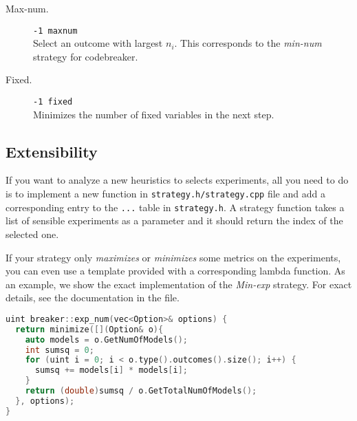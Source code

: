 \begin{description}
\item[Max-num.] \texttt{-1 maxnum} \\
  Select an outcome with largest $n_i$. This
  corresponds to the \emph{min-num} strategy for codebreaker.
\item[Fixed.] \texttt{-1 fixed} \\
  Minimizes the number of fixed variables in the next step.
\end{description}

\subsection{Extensibility}

If you want to analyze a new heuristics to selects experiments,
  all you need to do is to implement a new function
  in \texttt{strategy.h/strategy.cpp} file and add a corresponding entry
  to the \texttt{...} table in \texttt{strategy.h}.
A strategy function takes a list of sensible experiments as a parameter
  and it should return the index of the selected one.

If your strategy only \emph{maximizes} or \emph{minimizes}
  some metrics on the experiments,
  you can even use a template provided with a corresponding lambda function.
As an example, we show the exact implementation of the \emph{Min-exp} strategy.
For exact details, see the documentation in the file.

\begin{lstlisting}[language=C++]
uint breaker::exp_num(vec<Option>& options) {
  return minimize([](Option& o){
    auto models = o.GetNumOfModels();
    int sumsq = 0;
    for (uint i = 0; i < o.type().outcomes().size(); i++) {
      sumsq += models[i] * models[i];
    }
    return (double)sumsq / o.GetTotalNumOfModels();
  }, options);
}
\end{lstlisting}


